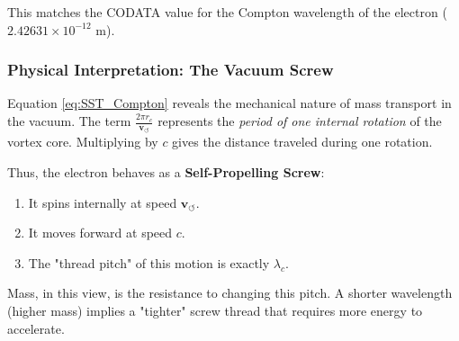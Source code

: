 \documentclass[10pt,reprint,aps,onecolumn,nofootinbib]{revtex4-2}
\begin{document}
            This matches the CODATA value for the Compton wavelength of the electron
            ($2.42631 \times 10^{-12}$ m).

        \subsubsection*{Physical Interpretation: The Vacuum Screw}

            Equation \eqref{eq:SST_Compton} reveals the mechanical nature of mass
            transport in the vacuum.
            The term $\frac{2\pi r_c}{\mathbf{v}_{\!\boldsymbol{\circlearrowleft}}}$ represents the \emph{period of one internal rotation}
            of the vortex core. Multiplying by $c$ gives the distance traveled
            during one rotation.

            Thus, the electron behaves as a \textbf{Self-Propelling Screw}:
            \begin{enumerate}
                \item It spins internally at speed $\mathbf{v}_{\!\boldsymbol{\circlearrowleft}}$.
                \item It moves forward at speed $c$.
                \item The "thread pitch" of this motion is exactly $\lambda_c$.
            \end{enumerate}

            Mass, in this view, is the resistance to changing this pitch. A shorter
            wavelength (higher mass) implies a "tighter" screw thread that requires
            more energy to accelerate.

\end{document}
